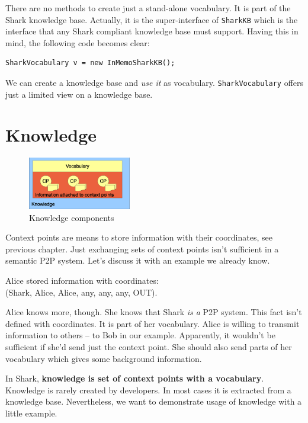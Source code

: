 There are no methods to create just a stand-alone vocabulary. It is part of the Shark knowledge base. Actually, it is the super-interface of {\tt SharkKB} which is the interface that any Shark compliant knowledge base must support.
Having this in mind, the following code becomes clear:

\begin{verbatim}
SharkVocabulary v = new InMemoSharkKB();
\end{verbatim}

We can create a knowledge base and {\it use it} as vocabulary.
{\tt SharkVocabulary} offers just a limited view on a knowledge base.

\section{Knowledge}
\begin{figure}[t]
\centering
\includegraphics[width=0.40\textwidth]{knowledgecomponents.eps}
\caption{Knowledge components}
\label{fig:knowledgecomponents}
\end{figure}

Context points are means to store information with their coordinates, see previous chapter. Just exchanging sets of context points isn't sufficient in a semantic P2P system. Let's discuss it with an example we already know.

Alice stored information with coordinates: \\
(Shark, Alice, Alice, any, any, any, OUT).

Alice knows more, though. She knows that Shark {\it is a} P2P system. This fact isn't defined with coordinates. It is part of her vocabulary. Alice is willing to transmit information to others -- to Bob in our example. Apparently, it wouldn't be sufficient if she'd send just the context point. She should also send parts of her vocabulary which gives some background information.

In Shark, {\bf knowledge is set of context points with a vocabulary}. Knowledge is rarely created by developers. In most cases it is extracted from a knowledge base. Nevertheless, we want to demonstrate usage of knowledge with a little example.


